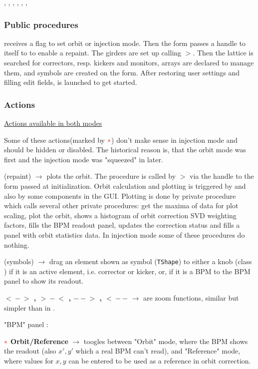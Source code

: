 \documentclass[12pt]{article}
\newcommand{\redast}{{\color{red}\ast}}
\newcommand\code[1]{{\tt #1}}
\newcommand{\ofld}[1]{\colorbox{black!15}{{\bf #1}}}
\newcommand{\ofldx}[1]{\colorbox{black!15}{(#1)}}
\newcommand\guico[1]{{\color{blue}\code{#1}}}
\newcommand{\unico}[1]{{\color{burntorange}\code{#1}}}
\newcommand{\evcod}[2]{\ofld{#1} $\rightarrow$ \guico{#2}}
\newcommand{\evcodx}[2]{\ofldx{#1} $\rightarrow$ \guico{#2}}
\newcommand{\prcod}[2]{\opauni{#1}$>$\unico{#2}}
\newcommand{\opagui}[1]{\colorbox{blue!20}{{\color{black}\code{#1}}}}
\newcommand{\ogui}[1]{\hyperref[#1]{\opagui{#1}}}
\newcommand{\opaguif}[1]{\colorbox{violet!30}{{\color{black}\code{#1}}}}
\newcommand{\oguif}[1]{\hyperref[#1]{\opaguif{#1}}}
\newcommand{\opauni}[1]{\colorbox{orange!30}{{\color{black}\code{#1}}}}
\newcommand{\ouni}[1]{\hyperref[#1]{\opauni{#1}}}
\newcommand{\uses}[1]{\flushleft {\bf Uses:} #1}
\newcommand{\act}[1]{\subsubsection*{Actions} #1}
\newcommand{\ppro}[1]{\subsubsection*{Public procedures} #1}
\newcommand{\todo}[1]{{\color{red} #1}}
\begin{document}
\uses{
\oguif{knobframe},  \ouni{linoplib}, \ouni{ostartmenu}, \ouni{globlib}, \ouni{mathlib}, \oguif{../com/asfigure}, \ouni{../com/asaux}
}

\ppro{
\guico{Start} receives a flag to set orbit or injection mode. Then the form passes a handle to itself to \ogui{linoplib} to enable a repaint. The girders are set up calling \prcod{globlib}{GirderSetup}. Then the lattice is searched for correctors, resp. kickers and monitors, arrays are declared to manage them, and symbols are created on the form. After restoring user settings and filling edit fields, \ogui{ostartmenu} is launched to get started.
}

\act{}

\underline{Actions available in both modes}

\todo{Some of these actions(marked by $\redast$) don't make sense in injection mode and should be hidden or disabled. The historical reason is, that the orbit mode was first and the injection mode was "squeezed" in later.}

\evcodx{repaint}{FormPaint} plots the orbit. The procedure is called by \prcod{linoplib}{PlotOrbit} via the handle to the form passed at initialization. Orbit calculation and plotting is triggered by  \ogui{ostartmenu} and also by some components in the GUI. Plotting is done by private procedure \guico{Makeplot} which calls several other private procedures: \guico{Get (Orbit, Cor, Mis) Max} get the maxima of data for plot scaling, \guico{plot(X,Y)} plot the orbit, \guico{WeightPlot} shows a histogram of orbit correction SVD weighting factors, \guico{BPMshow} fills the BPM readout panel,  \guico{LabelShow} updates the correction status and \guico{CodStat} fills a panel with orbit statistics data. In injection mode some of these procedures do nothing.

\evcodx{symbols}{BoxMouse(Down, Up)} drag an element shown as symbol (\code{TShape}) to either a knob (class \oguif{knobframe}) if it is an active element, i.e. corrector or kicker, or, if it is a BPM to the BPM panel \guico{panbpm} to show its readout.

\evcod{$<\!\!-\!\!>$ , $>\!\!-\!\!<$ , $--\!\!>$ , $<\!\!--$}{butzooClick} are zoom functions, similar but simpler than in \ogui{opalinop}.

"BPM" panel \guico{panbpm}:

$\redast$ \evcod{Orbit/Reference}{butBPMmpodeClick} toogles between "Orbit" mode, where the BPM shows the readout (also $x',y'$ which a real BPM can't read), and "Reference" mode, where values for $x, y$ can be entered to be used as a reference in orbit correction.
\end{document}
